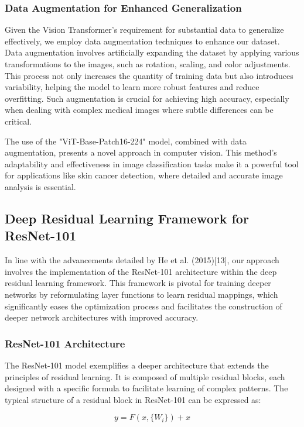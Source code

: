 \documentclass[conference]{IEEEtran}
\begin{document}
\subsubsection{Data Augmentation for Enhanced Generalization}
Given the Vision Transformer's requirement for substantial data to generalize effectively, we employ data augmentation techniques to enhance our dataset. Data augmentation involves artificially expanding the dataset by applying various transformations to the images, such as rotation, scaling, and color adjustments. This process not only increases the quantity of training data but also introduces variability, helping the model to learn more robust features and reduce overfitting. Such augmentation is crucial for achieving high accuracy, especially when dealing with complex medical images where subtle differences can be critical.

The use of the "ViT-Base-Patch16-224" model, combined with data augmentation, presents a novel approach in computer vision. This method's adaptability and effectiveness in image classification tasks make it a powerful tool for applications like skin cancer detection, where detailed and accurate image analysis is essential.

\subsection{Deep Residual Learning Framework for ResNet-101}

In line with the advancements detailed by He et al. (2015)[13], our approach involves the implementation of the ResNet-101 architecture within the deep residual learning framework. This framework is pivotal for training deeper networks by reformulating layer functions to learn residual mappings, which significantly eases the optimization process and facilitates the construction of deeper network architectures with improved accuracy.

\subsubsection{ResNet-101 Architecture}

The ResNet-101 model exemplifies a deeper architecture that extends the principles of residual learning. It is composed of multiple residual blocks, each designed with a specific formula to facilitate learning of complex patterns. The typical structure of a residual block in ResNet-101 can be expressed as:

\begin{equation}
    y = F(x, \{W_i\}) + x
\end{equation}
\end{document}
